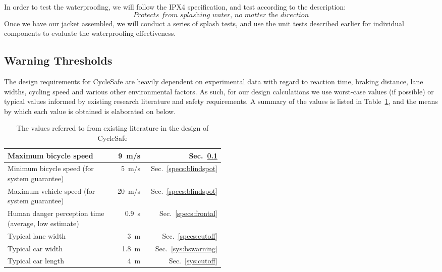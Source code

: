 \documentclass[journal]{IEEEtran}
\begin{document}
In order to test the waterproofing, we will follow the IPX4 specification\cite{ipx-waterproofing}, and test according to the description:
\begin{equation}
    \textit{Protects from splashing water, no matter the direction}
\end{equation}
Once we have our jacket assembled, we will conduct a series of splash tests, and use the unit tests described earlier for individual components to evaluate the waterproofing effectiveness. 

\subsection{Warning Thresholds}
\label{specs:warning_thresholds}
The design requirements for CycleSafe are heavily dependent on experimental data with regard to reaction time, braking distance, lane widths, cycling speed and various other environmental factors. As such, for our design calculations we use worst-case values (if possible) or typical values informed by existing research literature and safety requirements. A summary of the values is listed in Table~\ref{table-values}, and the means by which each value is obtained is elaborated on below.

\begin{table}[H]
    \centering
    \begin{tabular}{|p{0.5\linewidth}|r|r|}
        \hline
        Maximum bicycle speed & \SI{9}{\meter/\s} & Sec.~\ref{specs:warning_thresholds} \\ \hline
        Minimum bicycle speed (for system guarantee) & \SI{5}{\meter/\s} & Sec.~\ref{specs:blindspot} \\  \hline
        Maximum vehicle speed (for system guarantee) & \SI{20}{\meter/\s} & Sec.~\ref{specs:blindspot} \\  \hline
        Human danger perception time (average, low estimate) & \SI{0.9}{\s} & Sec.~\ref{specs:frontal} \\ \hline
        Typical lane width & \SI{3}{\m} & Sec.~\ref{specs:cutoff} \\ \hline
        Typical car width & \SI{1.8}{\m} & Sec.~\ref{sys:bswarning} \\ \hline
        Typical car length & \SI{4}{\m} & Sec.~\ref{sys:cutoff} \\ \hline
    \end{tabular}
    \vspace{6pt}
    \caption{The values referred to from existing literature in the design of CycleSafe}
    \label{table-values}
\end{table}
\end{document}
